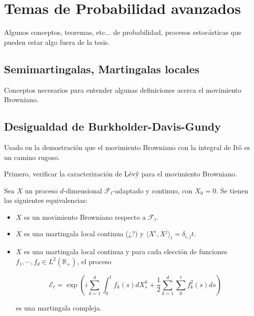 \section{Temas de Probabilidad avanzados}

Algunos conceptos, teoremas, etc... de probabilidad, procesos estocásticas que pueden estar algo fuera de la tesis.

\subsection{Semimartingalas, Martingalas locales}

Conceptos necesarios para entender algunas definiciones acerca el movimiento Browniano.



\subsection{Desigualdad de Burkholder-Davis-Gundy}

Usado en la demostración que el movimiento Browniano con la integral de Itô es un camino rugoso.



Primero, verificar la caracterización de Lévŷ para el movimiento Browniano.

\begin{theorem}[Lévy]
	Sea $X$ un proceso $d$-dimensional $\mathcal{F}_t$-adaptado y continuo, con $X_0 = 0$. Se tienen las siguientes equivalencias:

	\begin{itemize}

		\item $X$ es un movimiento Browniano respecto a $\mathcal{F}_t$.

		\item $X$ es una martingala local continua (¿?) y $\langle X^i, X^j \rangle_t = \delta_{i,j} t$.

		\item $X$ es una martingala local continua y para cada elección de funciones $f_1, \cdots, f_d \in L^2 (\mathbb{R}_+)$, el proceso

		\[
			\mathcal{E}_t = \exp \left( i \sum_{k = 1}^d \int_0^t f_k (s) dX^k_s + \frac{1}{2} \sum_{k=1}^d \sum_0^t f^2_k(s) ds \right)
		\]

		es una martingala compleja.
	
	\end{itemize}

\end{theorem}